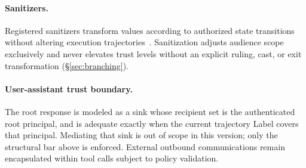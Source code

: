 \paragraph{Sanitizers.}
Registered sanitizers transform values according to authorized state transitions without altering execution trajectories~\cite{bhagwatkarIndirectPromptInjections2025,caiGhostAgentRedefining2026}. Sanitization adjusts audience scope exclusively and never elevates trust levels without an explicit ruling, cast, or exit transformation (\S\ref{sec:branching}).

\paragraph{User-assistant trust boundary.}
The root response is modeled as a sink whose recipient set is the authenticated root principal, and is adequate exactly when the current trajectory Label covers that principal. Mediating that sink is out of scope in this version; only the structural bar above is enforced. External outbound communications remain encapsulated within tool calls subject to policy validation.

